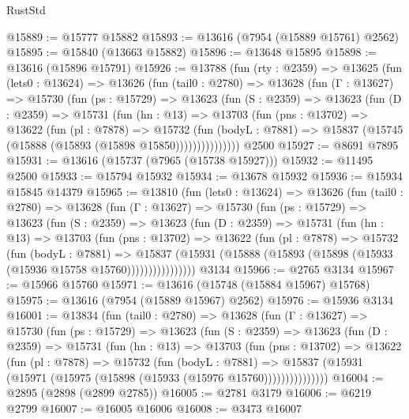 \begin{lexlean}{RustStd}
\begin{coremodule}
@15889 := @15777 @15882
@15893 := @13616 (@7954 (@15889 @15761) @2562)
@15895 := @15840 (@13663 @15882)
@15896 := @13648 @15895
@15898 := @13616 (@15896 @15791)
@15926 := @13788
    (fun (rty : @2359) =>
    @13625
      (fun (lets0 : @13624) =>
      @13626
        (fun (tail0 : @2780) =>
        @13628
          (fun (Γ : @13627) =>
          @15730
            (fun (ps : @15729) =>
            @13623
              (fun (S : @2359) =>
              @13623
                (fun (D : @2359) =>
                @15731
                  (fun (hn : @13) =>
                  @13703
                    (fun (pns : @13702) =>
                    @13622
                      (fun (pl : @7878) =>
                      @15732
                        (fun (bodyL : @7881) =>
                        @15837 (@15745 (@15888 (@15893 (@15898 @15850)))))))))))))))
    @2500
@15927 := @8691 @7895
@15931 := @13616 (@15737 (@7965 (@15738 @15927)))
@15932 := @11495 @2500
@15933 := @15794 @15932
@15934 := @13678 @15932
@15936 := @15934 @15845 @14379
@15965 := @13810
    (fun (lets0 : @13624) =>
    @13626
      (fun (tail0 : @2780) =>
      @13628
        (fun (Γ : @13627) =>
        @15730
          (fun (ps : @15729) =>
          @13623
            (fun (S : @2359) =>
            @13623
              (fun (D : @2359) =>
              @15731
                (fun (hn : @13) =>
                @13703
                  (fun (pns : @13702) =>
                  @13622
                    (fun (pl : @7878) =>
                    @15732
                      (fun (bodyL : @7881) =>
                      @15837
                        (@15931
                          (@15888 (@15893 (@15898 (@15933 (@15936 @15758 @15760))))))))))))))))
    @3134
@15966 := @2765 @3134
@15967 := @15966 @15760
@15971 := @13616 (@15748 (@15884 @15967) @15768)
@15975 := @13616 (@7954 (@15889 @15967) @2562)
@15976 := @15936 @3134
@16001 := @13834
    (fun (tail0 : @2780) =>
    @13628
      (fun (Γ : @13627) =>
      @15730
        (fun (ps : @15729) =>
        @13623
          (fun (S : @2359) =>
          @13623
            (fun (D : @2359) =>
            @15731
              (fun (hn : @13) =>
              @13703
                (fun (pns : @13702) =>
                @13622
                  (fun (pl : @7878) =>
                  @15732
                    (fun (bodyL : @7881) =>
                    @15837 (@15931 (@15971 (@15975 (@15898 (@15933 (@15976 @15760)))))))))))))))
@16004 := @2895 (@2898 (@2899 @2785))
@16005 := @2781 @3179
@16006 := @6219 @2799
@16007 := @16005 @16006
@16008 := @3473 @16007

\end{coremodule}
\end{lexlean}
